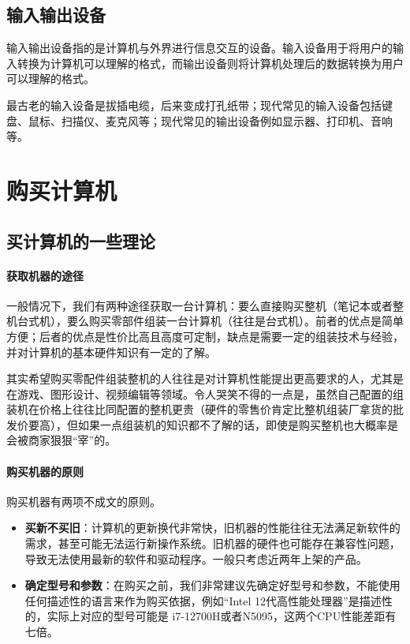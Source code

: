 \subsection{输入输出设备}

输入输出设备指的是计算机与外界进行信息交互的设备。输入设备用于将用户的输入转换为计算机可以理解的格式，而输出设备则将计算机处理后的数据转换为用户可以理解的格式。

最古老的输入设备是拔插电缆，后来变成打孔纸带；现代常见的输入设备包括键盘、鼠标、扫描仪、麦克风等；现代常见的输出设备例如显示器、打印机、音响等。


\section{购买计算机}

\subsection{买计算机的一些理论}

\paragraph{获取机器的途径}

一般情况下，我们有两种途径获取一台计算机：要么直接购买整机（笔记本或者整机台式机），要么购买零部件组装一台计算机（往往是台式机）。前者的优点是简单方便；后者的优点是性价比高且高度可定制，缺点是需要一定的组装技术与经验，并对计算机的基本硬件知识有一定的了解。

其实希望购买零配件组装整机的人往往是对计算机性能提出更高要求的人，尤其是在游戏、图形设计、视频编辑等领域。令人哭笑不得的一点是，虽然自己配置的组装机在价格上往往比同配置的整机更贵（硬件的零售价肯定比整机组装厂拿货的批发价要高），但如果一点组装机的知识都不了解的话，即使是购买整机也大概率是会被商家狠狠“宰”的。

\paragraph{购买机器的原则}

购买机器有两项不成文的原则。
\begin{itemize}
  \item \textbf{买新不买旧}：计算机的更新换代非常快，旧机器的性能往往无法满足新软件的需求，甚至可能无法运行新操作系统。旧机器的硬件也可能存在兼容性问题，导致无法使用最新的软件和驱动程序。一般只考虑近两年上架的产品。
  \item \textbf{确定型号和参数}：在购买之前，我们非常建议先确定好型号和参数，不能使用任何描述性的语言来作为购买依据，例如“Intel 12代高性能处理器”是描述性的，实际上对应的型号可能是 i7-12700H或者N5095，这两个CPU性能差距有七倍。
\end{itemize}

